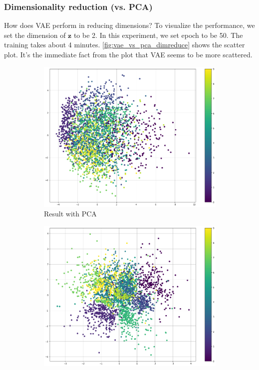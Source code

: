 \documentclass[a4paper,10pt,UTF8]{article}
\renewcommand*{\vec}[1]{\boldsymbol{#1}}
\numberwithin{equation}{section}
\numberwithin{figure}{section}
\begin{document}
\subsubsection{Dimensionality reduction (vs. PCA)}

How does VAE perform in reducing dimensions? To visualize the performance, we set the dimension of $\vec{z}$ to be 2. In this experiment, we set epoch to be 50. The training takes about 4 minutes. \autoref{fig:vae_vs_pca_dimreduce} shows the scatter plot. It's the immediate fact from the plot that VAE seems to be more scattered.

\begin{figure}[htbp]
    \centering
    \begin{subfigure}[h]{0.49\linewidth}
        \centering
        \includegraphics[width=1.0\textwidth]{img/dimreduce_pca.png}
        \caption{Result with PCA}
    \end{subfigure}
    \begin{subfigure}[h]{0.49\linewidth}
        \centering
        \includegraphics[width=1.0\textwidth]{img/dimreduce_vae.png}

\end{subfigure}
\end{figure}
\end{document}
